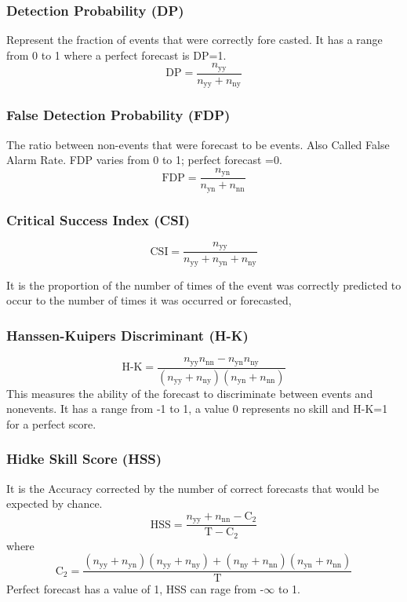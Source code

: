 \subsubsection{Detection Probability (DP)}
Represent the fraction of events that were correctly fore casted. It has a range from 0 to 1 where a perfect forecast is DP=1.
\begin{equation}
\textrm{DP}=\frac{n_\textrm{yy}}{n_\textrm{yy}+n_\textrm{ny}}
\label{DP}
\end{equation}

\subsubsection{False Detection Probability (FDP)}
 The ratio between non-events that were forecast to be events. Also Called False Alarm Rate. FDP varies from 0 to 1; perfect forecast =0.
 \begin{equation}
\textrm{FDP}=\frac{n_\textrm{yn}}{n_\textrm{yn}+n_\textrm{nn}}
\end{equation}
\subsubsection{Critical Success Index (CSI)}
 \begin{equation}
\textrm{CSI}=\frac{n_\textrm{yy}}{n_\textrm{yy}+n_\textrm{yn}+n_\textrm{ny}}
\label{CSI}
\end{equation}

It is the proportion of the number of times of the event was correctly predicted to occur to the number of times it was occurred or forecasted,
\subsubsection{Hanssen-Kuipers Discriminant (H-K)}
 \begin{equation}
\textrm{H-K}=\frac{n_\textrm{yy}n_\textrm{nn}-n_\textrm{yn}n_\textrm{ny}}{(n_\textrm{yy}+n_\textrm{ny})(n_\textrm{yn}+n_\textrm{nn})}
\label{HK}
\end{equation}
This measures the ability of the forecast to discriminate between events and nonevents. It has a range from -1 to 1, a value 0 represents no skill and H-K=1 for a perfect score.
\subsubsection{Hidke Skill Score (HSS)}
It is the Accuracy corrected by the number of correct forecasts that would be expected by chance.
 \begin{equation}
\textrm{HSS}=\frac{n_\textrm{yy}+n_\textrm{nn}-\textrm{C}_2}{\textrm{T}-\textrm{C}_2}
\label{HSS}
\end{equation}
where
 \begin{equation}
\textrm{C}_2=\frac{(n_\textrm{yy}+n_\textrm{yn})(n_\textrm{yy}+n_\textrm{ny})+(n_\textrm{ny}+n_\textrm{nn})(n_\textrm{yn}+n_\textrm{nn})}{\textrm{T}}
\end{equation}
Perfect forecast has a value of 1, HSS can rage from -$\infty$ to 1.
